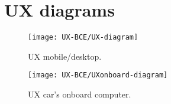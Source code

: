 \section{UX diagrams}

\begin{figure}[H]
	\centering
	\texttt{[image: UX-BCE/UX-diagram]}
	\caption[UX Diagram]{UX mobile/desktop.}
	\label{fig:UX-diagram}
\end{figure}

\begin{figure}[H]
	\centering
	\texttt{[image: UX-BCE/UXonboard-diagram]}
	\caption[UXonboard Diagram]{UX car's onboard computer.}
	\label{fig:UXonboard-diagram}
\end{figure}